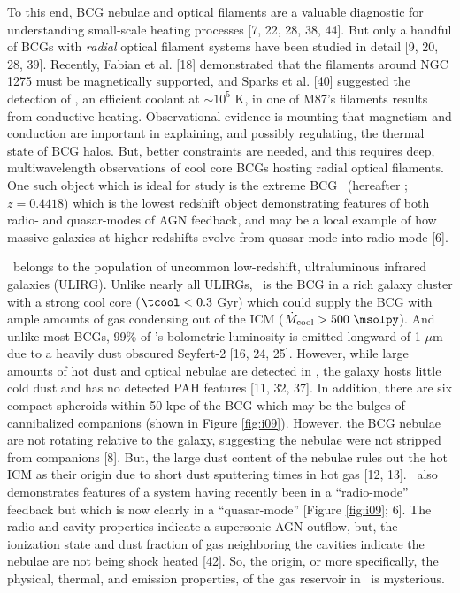 \documentclass[12pt]{article}
\begin{document}
To this end, BCG nebulae and optical filaments are a valuable
diagnostic for understanding small-scale heating processes [7, 22, 28,
  38, 44]. But only a handful of BCGs with {\it{radial}} optical
filament systems have been studied in detail [9, 20, 28,
  39]. Recently, Fabian et al. [18] demonstrated that the filaments
around NGC 1275 must be magnetically supported, and Sparks et al. [40]
suggested the detection of \civ, an efficient coolant at $\sim 10^{5}$
K, in one of M87's filaments results from conductive
heating. Observational evidence is mounting that magnetism and
conduction are important in explaining, and possibly regulating, the
thermal state of BCG halos. But, better constraints are needed, and
this requires deep, multiwavelength observations of cool core BCGs
hosting radial optical filaments. One such object which is ideal for
study is the extreme BCG \inine\ (hereafter \irs; $z=0.4418$) which is
the lowest redshift object demonstrating features of both radio- and
quasar-modes of AGN feedback, and may be a local example of how
massive galaxies at higher redshifts evolve from quasar-mode into
radio-mode [6].

\irs\ belongs to the population of uncommon low-redshift,
ultraluminous infrared galaxies (ULIRG). Unlike nearly all ULIRGs,
\irs\ is the BCG in a rich galaxy cluster with a strong cool core
($\tcool < 0.3$ Gyr) which could supply the BCG with ample amounts of
gas condensing out of the ICM ($\dot{M}_{\mathrm{cool}} > 500
~\msolpy$). And unlike most BCGs, 99\% of \irs's bolometric luminosity
is emitted longward of 1 $\mu$m due to a heavily dust obscured
Seyfert-2 [16, 24, 25]. However, while large amounts of hot dust and
optical nebulae are detected in \irs, the galaxy hosts little cold
dust and has no detected PAH features [11, 32, 37]. In addition, there
are six compact spheroids within 50 kpc of the BCG which may be the
bulges of cannibalized companions (shown in Figure
\ref{fig:i09}). However, the BCG nebulae are not rotating relative to
the galaxy, suggesting the nebulae were not stripped from companions
[8]. But, the large dust content of the nebulae rules out the hot ICM
as their origin due to short dust sputtering times in hot gas [12,
  13]. \irs\ also demonstrates features of a system having recently
been in a ``radio-mode'' feedback but which is now clearly in a
``quasar-mode'' [Figure \ref{fig:i09}; 6]. The radio and cavity
properties indicate a supersonic AGN outflow, but, the ionization
state and dust fraction of gas neighboring the cavities indicate the
nebulae are not being shock heated [42]. So, the origin, or more
specifically, the physical, thermal, and emission properties, of the
gas reservoir in \irs\ is mysterious.
\end{document}
